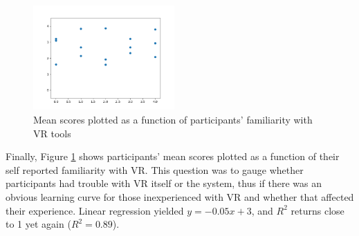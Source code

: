 \begin{figure}[H]
\centering
\includegraphics[width = 0.48\textwidth]{Familiarity.png}
\caption{Mean scores plotted as a function of participants' familiarity with VR tools}
\label{fig:fam}
\end{figure}

Finally, Figure \ref{fig:fam} shows participants' mean scores plotted as a function of their self reported familiarity with VR. This question was to gauge whether participants had trouble with VR itself or the system, thus if there was an obvious learning curve for those inexperienced with VR and whether that affected their experience. Linear regression yielded $y = -0.05x + 3$, and $R^2$ returns close to 1 yet again ($R^2=0.89$).